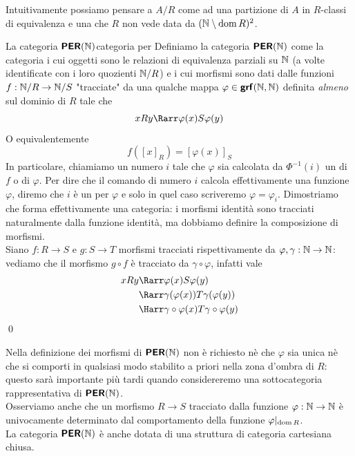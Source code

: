 \documentclass[openany]{book}
\begin{document}
Intuitivamente possiamo pensare a $A/R$ come ad una partizione di $A$ in $R$-classi di equivalenza e una  che $R$ non vede data da $(\mathbb{N}\setminus \operatorname{dom} R)^2$.

\begin{definition}{La categoria $\text{\sffamily\textbf{PER}}(\mathbb{N})$}{categoria per}
    Definiamo la categoria $\text{\sffamily\textbf{PER}}(\mathbb{N})$ come la categoria i cui oggetti sono le relazioni di equivalenza parziali su $\mathbb{N}$ (a volte identificate con i loro quozienti $\mathbb{N}/R$) e i cui morfismi sono dati dalle funzioni $f:\mathbb{N}/R\to\mathbb{N}/S$ "tracciate" da una qualche mappa $\varphi \in \text{\sffamily\textbf{grf}}(\mathbb{N},\mathbb{N})$ definita \textit{almeno} sul dominio di $R$ tale che 
    \[ xRy \Rarr \varphi(x)S \varphi(y) \]
    O equivalentemente 
    \[f([x]_R) =[\varphi(x)]_S\]
    In particolare, chiamiamo un numero $i$ tale che $\varphi$ sia calcolata da $\Phi^{-1}(i)$ un  di $f$ o di $\varphi$. Per dire che il comando di numero $i$ calcola effettivamente una funzione $\varphi$, diremo che $i$ è un  per $\varphi$ e solo in quel caso scriveremo $\varphi = \varphi_i$.
    \proof 
    Dimostriamo che forma effettivamente una categoria: i morfismi identità sono tracciati naturalmente dalla funzione identità, ma dobbiamo definire la composizione di morfismi.\\
    Siano $f:R\to S$ e $g: S\to T$ morfismi tracciati rispettivamente da $\varphi, \gamma : \mathbb{N}\to\mathbb{N}$: vediamo che il morfismo $g\circ f$ è tracciato da $\gamma \circ \varphi$, infatti vale
    \begin{align*}
        xRy & \Rarr \varphi(x)S \varphi(y) \\
        & \Rarr \gamma(\varphi(x))T \gamma(\varphi(y)) \\
        & \Harr \gamma \circ \varphi(x) T \gamma \circ \varphi(y)
    \end{align*}
    \qed
\end{definition}

Nella definizione dei morfismi di $\text{\sffamily\textbf{PER}}(\mathbb{N})$ non è richiesto nè che $\varphi$ sia unica nè che si comporti in qualsiasi modo stabilito a priori nella zona d'ombra di $R$: questo sarà importante più tardi quando considereremo una sottocategoria rappresentativa di $\text{\sffamily\textbf{PER}}(\mathbb{N})$.\\
Osserviamo anche che un morfismo $R\to S$ tracciato dalla funzione $\varphi:\mathbb{N}\to\mathbb{N}$ è univocamente determinato dal comportamento della funzione $\varphi|_{\operatorname{dom} R}$.\\
La categoria $\text{\sffamily\textbf{PER}}(\mathbb{N})$ è anche dotata di una struttura di categoria cartesiana chiusa. 
\end{document}

